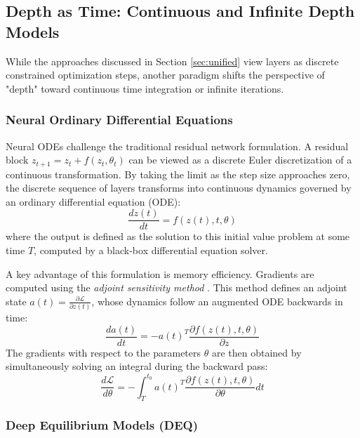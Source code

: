 \documentclass{article}
\begin{document}
\subsection{Depth as Time: Continuous and Infinite Depth Models}
\label{sec:depth_as_time}

While the approaches discussed in Section \ref{sec:unified} view layers as discrete constrained optimization steps, another paradigm shifts the perspective of "depth" toward continuous time integration or infinite iterations.

\subsubsection{Neural Ordinary Differential Equations}

Neural ODEs \cite{chen2018neuralode} challenge the traditional residual network formulation. A residual block $z_{t+1} = z_t + f(z_t, \theta_t)$ can be viewed as a discrete Euler discretization of a continuous transformation. By taking the limit as the step size approaches zero, the discrete sequence of layers transforms into continuous dynamics governed by an ordinary differential equation (ODE):
\begin{equation}
  \frac{dz(t)}{dt} = f(z(t), t, \theta)
\end{equation}
where the output is defined as the solution to this initial value problem at some time $T$, computed by a black-box differential equation solver.

A key advantage of this formulation is memory efficiency. Gradients are computed using the \textit{adjoint sensitivity method} \cite{chen2018neuralode}. This method defines an adjoint state $a(t) = \frac{\partial \mathcal{L}}{\partial z(t)}$, whose dynamics follow an augmented ODE backwards in time:
\begin{equation}
  \frac{da(t)}{dt} = -a(t)^T \frac{\partial f(z(t), t, \theta)}{\partial z}
\end{equation}
The gradients with respect to the parameters $\theta$ are then obtained by simultaneously solving an integral during the backward pass:
\begin{equation}
  \frac{d\mathcal{L}}{d\theta} = -\int_{T}^{t_0} a(t)^T \frac{\partial f(z(t), t, \theta)}{\partial \theta} dt
\end{equation}

\subsubsection{Deep Equilibrium Models (DEQ)}
\end{document}
